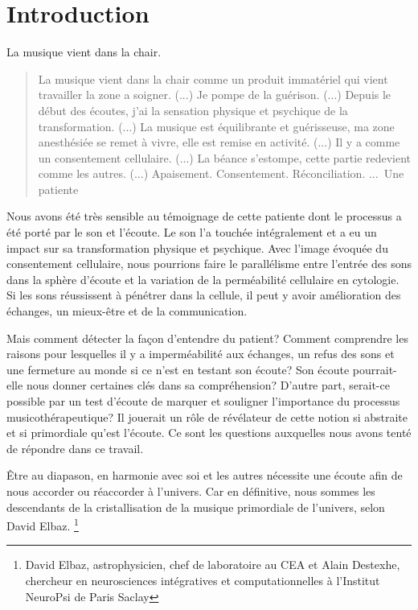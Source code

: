\chapter{Introduction}

La musique vient dans la chair.

\begin{quotation}
 La musique vient dans la chair comme un produit immatériel
 qui vient travailler la zone a soigner. (...)      Je pompe de la
 guérison. (...)
Depuis le début des écoutes, j'ai la sensation physique et
 psychique de la
 transformation. (...)  La musique est équilibrante et guérisseuse, ma zone
 anesthésiée se remet à vivre, elle est remise en activité. (...)
 Il y a comme un consentement cellulaire. (...)
La béance s'estompe, cette
partie redevient comme les autres. (...)
Apaisement. Consentement. Réconciliation.    
$\ldots$\  Une patiente\autocite{propos d'une patiente}
\end{quotation}

Nous avons été très sensible au témoignage de cette patiente dont le
processus a été porté par le son et l'écoute. Le son l'a touchée intégralement et  a eu un impact sur sa transformation physique
et psychique.
Avec l'image évoquée du
consentement cellulaire, nous pourrions faire le
parallélisme entre l'entrée des sons dans la sphère d'écoute et la variation de la 
perméabilité cellulaire en cytologie. Si les sons réussissent à pénétrer dans la
cellule, il peut y avoir amélioration des échanges, un mieux-être et de la
communication.

Mais comment détecter la façon d'entendre du patient?
Comment comprendre les raisons pour lesquelles il y a imperméabilité aux
échanges, un refus des sons et une fermeture au monde si ce n'est en testant
son écoute?  Son écoute pourrait-elle nous donner certaines clés dans sa
compréhension? D'autre part, serait-ce  possible  par un test d'écoute
de marquer et souligner l'importance du processus musicothérapeutique? 
Il jouerait un
rôle de
révélateur de cette notion si abstraite et si primordiale qu'est l'écoute.
Ce sont les questions auxquelles nous avons tenté de
répondre dans ce travail.


Être au diapason, en harmonie avec soi et les autres
nécessite une écoute afin de nous accorder ou réaccorder à l'univers.
Car en définitive, nous sommes les
descendants de la cristallisation de la musique primordiale de
l'univers, selon
David Elbaz.  \footnote{David Elbaz, astrophysicien, chef de laboratoire au CEA et Alain
Destexhe, chercheur en neurosciences intégratives et computationnelles
à l'Institut  NeuroPsi de Paris Saclay} \autocite{delbaz_recherche_2016}

